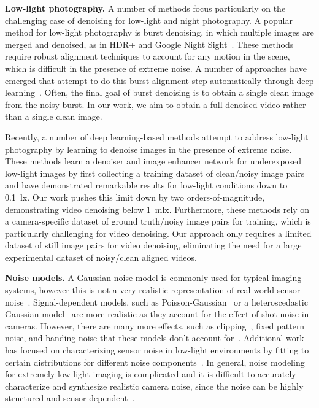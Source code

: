 \documentclass[final]{cvpr}
\begin{document}
\vspace{1mm}\noindent\textbf{Low-light photography.}
A number of methods focus particularly on the challenging case of denoising for low-light and night photography. A popular method for low-light photography is burst denoising, in which multiple images are merged and denoised, as in HDR+ and Google Night Sight~\cite{ hasinoff2016burst,liba2019handheld}. These methods require robust alignment techniques to account for any motion in the scene, which is difficult in the presence of extreme noise. A number of approaches have emerged that attempt to do this burst-alignment step automatically through deep learning~\cite{mildenhall2018burst, godard2018deep}. Often, the final goal of burst denoising is to obtain a single clean image from the noisy burst. In our work, we aim to obtain a full denoised video rather than a single clean image. 

Recently, a number of deep learning-based methods attempt to address low-light photography by learning to denoise images in the presence of extreme noise. These methods learn a denoiser and image enhancer network for underexposed low-light images by first collecting a training dataset of clean/noisy image pairs~\cite{chen2018learning, jiang2019learning,chen2019seeing} and have demonstrated remarkable results for low-light conditions down to 0.1~\si{\lux}. 
Our work pushes this limit down by two orders-of-magnitude, demonstrating video denoising below 1~\si{\milli\lux}.
Furthermore, these methods rely on a camera-specific dataset of ground truth/noisy image pairs for training, which is particularly challenging for video denoising. Our approach only requires a limited dataset of still image pairs for video denoising, eliminating the need for a large experimental dataset of noisy/clean aligned videos.









\vspace{1mm}\noindent\textbf{Noise models.}
A Gaussian noise model is commonly used for typical imaging systems, however this is not a very realistic representation of real-world sensor noise~\cite{plotz2017benchmarking}. Signal-dependent models, such as Poisson-Gaussian~\cite{foi2008practical, foi2009clipped} or a heteroscedastic Gaussian model~\cite{hasinoff2014photon} are more realistic as they account for the effect of shot noise in cameras. However, there are many more effects, such as clipping~\cite{foi2008practical}, fixed pattern noise, and banding noise that these models don't account for~\cite{konnik2014high, boukhayma2018low}. Additional work has focused on characterizing sensor noise in low-light environments by fitting to certain distributions for different noise components~\cite{wang2019enhancing, wei2020physics}. In general, noise modeling for extremely low-light imaging is complicated and it is difficult to accurately characterize and synthesize realistic camera noise, since the noise can be highly structured and sensor-dependent~\cite{emva1288, konnik2014high}. 
\end{document}
